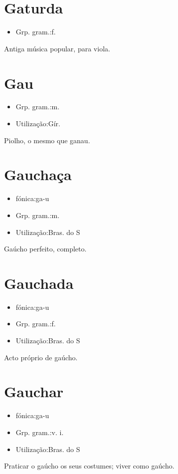 \section{Gaturda}
\begin{itemize}
\item {Grp. gram.:f.}
\end{itemize}
Antiga música popular, para viola.
\section{Gau}
\begin{itemize}
\item {Grp. gram.:m.}
\end{itemize}
\begin{itemize}
\item {Utilização:Gír.}
\end{itemize}
Piolho, o mesmo que \textunderscore ganau\textunderscore .
\section{Gauchaça}
\begin{itemize}
\item {fónica:ga-u}
\end{itemize}
\begin{itemize}
\item {Grp. gram.:m.}
\end{itemize}
\begin{itemize}
\item {Utilização:Bras. do S}
\end{itemize}
Gaúcho perfeito, completo.
\section{Gauchada}
\begin{itemize}
\item {fónica:ga-u}
\end{itemize}
\begin{itemize}
\item {Grp. gram.:f.}
\end{itemize}
\begin{itemize}
\item {Utilização:Bras. do S}
\end{itemize}
Acto próprio de gaúcho.
\section{Gauchar}
\begin{itemize}
\item {fónica:ga-u}
\end{itemize}
\begin{itemize}
\item {Grp. gram.:v. i.}
\end{itemize}
\begin{itemize}
\item {Utilização:Bras. do S}
\end{itemize}
Praticar o gaúcho os seus costumes; viver como gaúcho.
